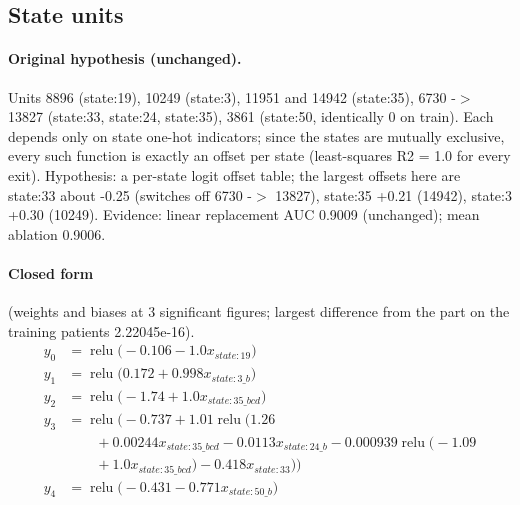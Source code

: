 \documentclass[a4paper,10pt]{article}
\newif\ifreviewmarks
\newcommand{\reviewrule}{\noindent{\color{BrickRed}\rule{\linewidth}{0.8pt}}}
\newenvironment{drafted}[1][]{%
  \ifreviewmarks\par\addvspace{\medskipamount}\reviewrule\par\nopagebreak
  \noindent{\color{BrickRed}\sffamily\footnotesize\textbf{Thesis Draft}\quad #1\hfill review}\par\nopagebreak\smallskip\fi}{%
  \ifreviewmarks\par\smallskip\noindent{\color{BrickRed}\sffamily\footnotesize end of thesis draft}\par\nopagebreak\reviewrule\par\medskip\fi}
\begin{document}
\begin{drafted}[plain-language layer: churn100-s2-c1]
\subsection{State units}\label{tech:ann96}
\paragraph{Original hypothesis (unchanged).} Units 8896 (state:19), 10249 (state:3), 11951 and 14942 (state:35), 6730 -$>$ 13827 (state:33, state:24, state:35), 3861 (state:50, identically 0 on train). Each depends only on state one-hot indicators; since the states are mutually exclusive, every such function is exactly an offset per state (least-squares R2 = 1.0 for every exit). Hypothesis: a per-state logit offset table; the largest offsets here are state:33 about -0.25 (switches off 6730 -$>$ 13827), state:35 +0.21 (14942), state:3 +0.30 (10249). Evidence: linear replacement AUC 0.9009 (unchanged); mean ablation 0.9006.
\paragraph{Closed form} {\footnotesize(weights and biases at 3 significant figures; largest difference from the part on the training patients 2.22045e-16).}
{\small\begingroup\allowdisplaybreaks
\begin{align*}
y_{0} &= \operatorname{relu}\bigl(-0.106 - 1.0 x_{state:19}\bigr) \\
y_{1} &= \operatorname{relu}\bigl(0.172 + 0.998 x_{state:3\_b}\bigr) \\
y_{2} &= \operatorname{relu}\bigl(-1.74 + 1.0 x_{state:35\_bcd}\bigr) \\
y_{3} &= \operatorname{relu}\bigl(-0.737 + 1.01 \operatorname{relu}\bigl(1.26 \\
&\qquad + 0.00244 x_{state:35\_bcd} - 0.0113 x_{state:24\_b} - 0.000939 \operatorname{relu}\bigl(-1.09 \\
&\qquad + 1.0 x_{state:35\_bcd}\bigr) - 0.418 x_{state:33}\bigr)\bigr) \\
y_{4} &= \operatorname{relu}\bigl(-0.431 - 0.771 x_{state:50\_b}\bigr)
\end{align*}\endgroup}


\end{drafted}
\end{document}

